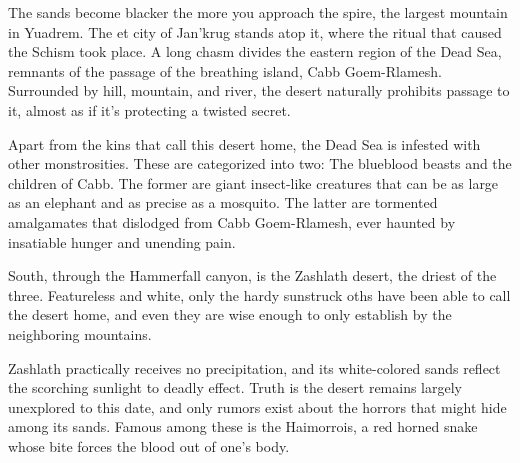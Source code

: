 The sands become blacker the more you approach the spire, the largest mountain in Yuadrem.
The et city of Jan'krug stands atop it, where the ritual that caused the Schism took place.
A long chasm divides the eastern region of the Dead Sea, remnants of the passage of the breathing island, Cabb Goem-Rlamesh.
Surrounded by hill, mountain, and river, the desert naturally prohibits passage to it, almost as if it's protecting a twisted secret.

Apart from the kins that call this desert home, the Dead Sea is infested with other monstrosities.
These are categorized into two: The blueblood beasts and the children of Cabb.
The former are giant insect-like creatures that can be as large as an elephant and as precise as a mosquito.
The latter are tormented amalgamates that dislodged from Cabb Goem-Rlamesh, ever haunted by insatiable hunger and unending pain.


South, through the Hammerfall canyon, is the Zashlath desert, the driest of the three.
Featureless and white, only the hardy sunstruck oths have been able to call the desert home, and even they are wise enough to only establish by the neighboring mountains.

Zashlath practically receives no precipitation, and its white-colored sands reflect the scorching sunlight to deadly effect.
Truth is the desert remains largely unexplored to this date, and only rumors exist about the horrors that might hide among its sands.
Famous among these is the Haimorrois, a red horned snake whose bite forces the blood out of one's body.
